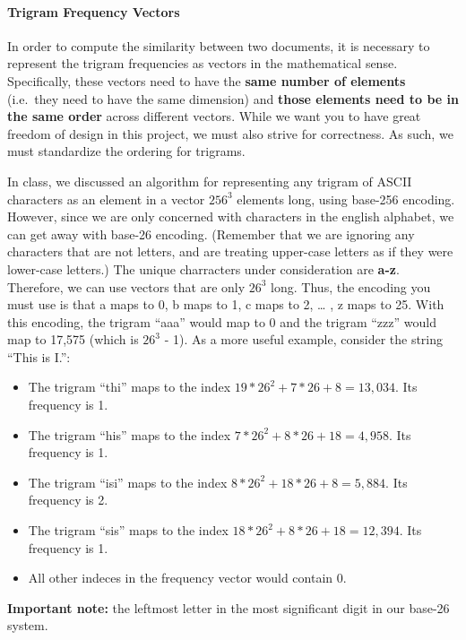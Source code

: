 \documentclass[]{article}
\providecommand{\tightlist}{%
  \setlength{\itemsep}{0pt}\setlength{\parskip}{0pt}}
\let\oldparagraph\paragraph
\renewcommand{\paragraph}[1]{\oldparagraph{#1}\mbox{}}
\begin{document}
\paragraph{Trigram Frequency Vectors}\label{trigram-frequency-vectors}

In order to compute the similarity between two documents, it is
necessary to represent the trigram frequencies as vectors in the
mathematical sense. Specifically, these vectors need to have the
\textbf{same number of elements} (i.e.~they need to have the same
dimension) and \textbf{those elements need to be in the same order}
across different vectors. While we want you to have great freedom of
design in this project, we must also strive for correctness. As such, we
must standardize the ordering for trigrams.

In class, we discussed an algorithm for representing any trigram of
ASCII characters as an element in a vector \(256^3\) elements long,
using base-256 encoding. However, since we are only concerned with
characters in the english alphabet, we can get away with base-26
encoding. (Remember that we are ignoring any characters that are not
letters, and are treating upper-case letters as if they were lower-case
letters.) The unique charracters under consideration are \textbf{a-z}.
Therefore, we can use vectors that are only \(26^3\) long. Thus, the
encoding you must use is that a maps to 0, b maps to 1, c maps to 2,
\ldots{} , z maps to 25. With this encoding, the trigram ``aaa'' would
map to 0 and the trigram ``zzz'' would map to 17,575 (which is \(26^3\)
- 1). As a more useful example, consider the string ``This is I.'':

\begin{itemize}
\tightlist
\item
  The trigram ``thi'' maps to the index \(19*26^2 + 7*26 + 8 = 13,034\).
  Its frequency is 1.
\item
  The trigram ``his'' maps to the index \(7*26^2 + 8*26 + 18 = 4,958\).
  Its frequency is 1.
\item
  The trigram ``isi'' maps to the index \(8*26^2 + 18*26 + 8 = 5,884\).
  Its frequency is 2.
\item
  The trigram ``sis'' maps to the index
  \(18*26^2 + 8*26 + 18 = 12,394\). Its frequency is 1.
\item
  All other indeces in the frequency vector would contain 0.
\end{itemize}

\textbf{Important note:} the leftmost letter in the most significant
digit in our base-26 system.
\end{document}
